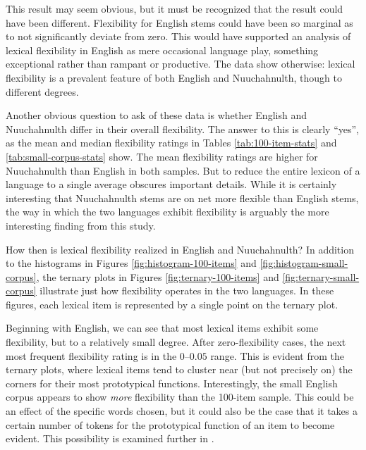 This result may seem obvious, but it must be recognized that the result could have been different. Flexibility for English stems could have been so marginal as to not significantly deviate from zero. This would have supported an analysis of lexical flexibility in English as mere occasional language play, something exceptional rather than rampant or productive. The data show otherwise: lexical flexibility is a prevalent feature of both English and Nuuchahnulth, though to different degrees.

Another obvious question to ask of these data is whether English and Nuuchahnulth differ in their overall flexibility. The answer to this is clearly \enquote{yes}, as the mean and median flexibility ratings in Tables \ref{tab:100-item-stats} and \ref{tab:small-corpus-stats} show. The mean flexibility ratings are higher for Nuuchahnulth than English in both samples.  But to reduce the entire lexicon of a language to a single average obscures important details. While it is certainly interesting that Nuuchahnulth stems are on net more flexible than English stems, the way in which the two languages exhibit flexibility is arguably the more interesting finding from this study.

How then is lexical flexibility realized in English and Nuuchahnulth? In addition to the histograms in Figures \ref{fig:histogram-100-items} and \ref{fig:histogram-small-corpus}, the ternary plots in Figures \ref{fig:ternary-100-items} and \ref{fig:ternary-small-corpus} illustrate just how flexibility operates in the two languages. In these figures, each lexical item is represented by a single point on the ternary plot.


Beginning with English, we can see that most lexical items exhibit some flexibility, but to a relatively small degree. After zero-flexibility cases, the next most frequent flexibility rating is in the $0$–$0.05$ range. This is evident from the ternary plots, where lexical items tend to cluster near (but not precisely on) the corners for their most prototypical functions. Interestingly, the small English corpus appears to show \emph{more} flexibility than the 100-item sample. This could be an effect of the specific words chosen, but it could also be the case that it takes a certain number of tokens for the prototypical function of an item to become evident. This possibility is examined further in .

